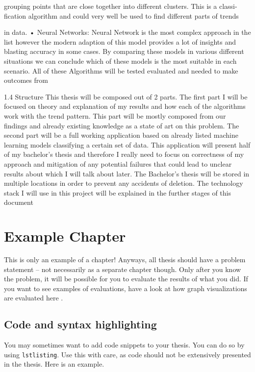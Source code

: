 \documentclass{imc-inf}
\begin{document}
grouping points that are close together into different clusters. This is a classi-
fication algorithm and could very well be used to find different parts of trends

in data.
• Neural Networks: Neural Network is the most complex approach in the list
however the modern adaption of this model provides a lot of insights and
blasting accuracy in some cases.
By comparing these models in various different situations we can conclude which
of these models is the most suitable in each scenario.
All of these Algorithms will be tested evaluated and needed to make outcomes
from

1.4 Structure
This thesis will be composed out of 2 parts. The first part I will be focused on
theory and explanation of my results and how each of the algorithms work with
the trend pattern. This part will be mostly composed from our findings and already
existing knowledge as a state of art on this problem. The second part will be a full
working application based on already listed machine learning models classifying
a certain set of data. This application will present half of my bachelor’s thesis and
therefore I really need to focus on correctness of my approach and mitigation of
any potential failures that could lead to unclear results about which I will talk about
later. The Bachelor’s thesis will be stored in multiple locations in order to prevent
any accidents of deletion. The technology stack I will use in this project will be
explained in the further stages of this document 


\chapter{Example Chapter}
This is only an example of a chapter! Anyways, all thesis should have a problem statement -- not necessarily as a separate chapter though. Only after you know the problem, it will be possible for you to evaluate the results of what you did. If you want to see examples of evaluations, have a look at how graph visualizations are evaluated here \cite{DBLP:journals/access/BurchHWPWH21}. 

\section{Code and syntax highlighting}

You may sometimes want to add code snippets to your thesis. You can do so by using \texttt{lstlisting}. Use this with care, as code should not be extensively presented in the thesis. Here is an example. 
\end{document}
